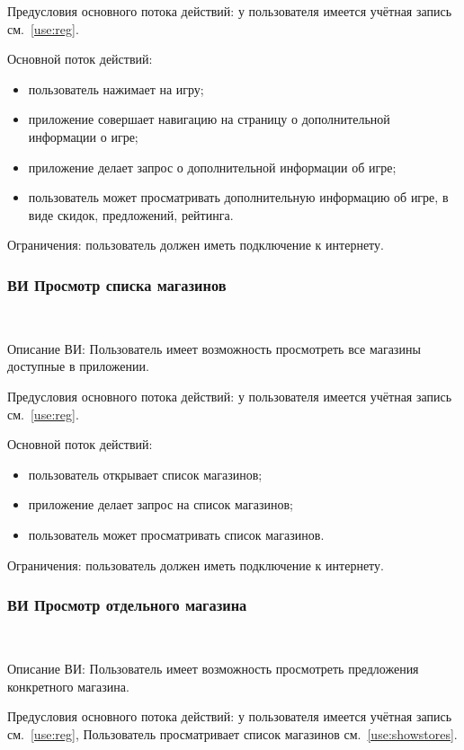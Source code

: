 Предусловия основного потока действий: у пользователя имеется учётная запись см.~\ref{use:reg}.

Основной поток действий:
\begin{itemize}
   \item пользователь нажимает на игру;
   \item приложение совершает навигацию на страницу о дополнительной информации о игре;
   \item приложение делает запрос о дополнительной информации об игре;
   \item пользователь может просматривать дополнительную информацию об игре, в виде скидок, предложений, рейтинга.
\end{itemize}
 
Ограничения: пользователь должен иметь подключение к интернету.
 
\subsubsection{ВИ Просмотр списка магазинов}~\par
\label{use:showstores}
Описание ВИ: Пользователь имеет возможность просмотреть все магазины доступные в приложении.
 
Предусловия основного потока действий: у пользователя имеется учётная запись см.~\ref{use:reg}.
 
Основной поток действий:
\begin{itemize}
   \item пользователь открывает список магазинов;
   \item приложение делает запрос на список магазинов;
   \item пользователь может просматривать список магазинов.
\end{itemize}
 
Ограничения: пользователь должен иметь подключение к интернету.

\subsubsection{ВИ Просмотр отдельного магазина}~\par
\label{use:singlestore}
Описание ВИ: Пользователь имеет возможность просмотреть предложения конкретного магазина.
 
Предусловия основного потока действий: у пользователя имеется учётная запись см.~\ref{use:reg}, Пользователь просматривает список магазинов см.~\ref{use:showstores}.
 
